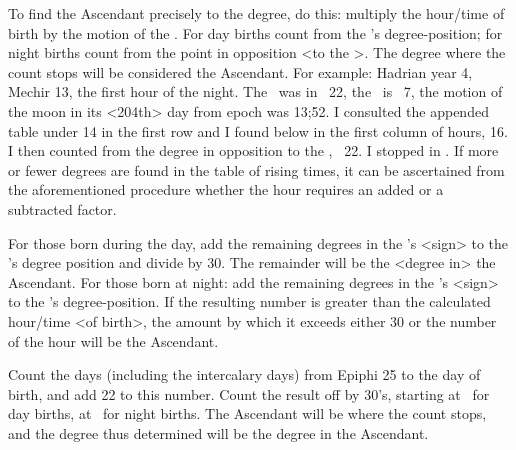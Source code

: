 To find the Ascendant precisely to the degree, do this: multiply the hour/time of birth by the motion of the \Moon. For day births count from the \Sun’s degree-position; for night births count from the point in opposition <to the \Sun>. The degree where the count stops will be considered the Ascendant. For example: Hadrian year 4, Mechir 13, the first hour of the night. The \Sun\, was in \Aquarius\, 22\deg, the \Moon\, is
\Scorpio\, 7\deg, the motion of the moon in its <204th> day from epoch was 13;52\deg. I consulted the appended
table under 14 in the first row and I found below in the first column of hours, 16. I then counted from the degree in opposition to the \Sun, \Leo\, 22\deg. I stopped in \deg. If more or fewer degrees are found in the table of rising times, it can be ascertained from the aforementioned procedure whether the hour requires an added or a subtracted factor.

For those born during the day, add the remaining degrees in the \Sun’s <sign> to the \Moon’s degree position and divide by 30. The remainder will be the <degree in> the Ascendant. For those born at night: add the remaining degrees in the \Moon’s <sign> to the \Sun’s degree-position. If the resulting number is
greater than the calculated hour/time <of birth>, the amount by which it exceeds either 30 or the number of the hour will be the Ascendant.

Count the days (including the intercalary days) from Epiphi 25 to the day of birth, and add 22 to this number. Count the result off by 30’s, starting at \Cancer\, for day births, at \Capricorn\, for night births. The Ascendant will be where the count stops, and the degree thus determined will be the degree in the Ascendant.

\newpage